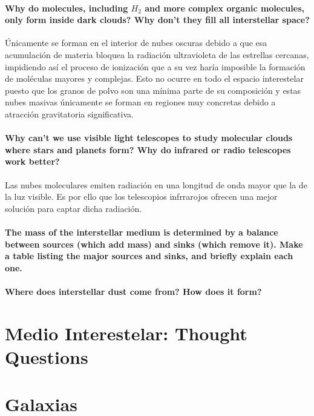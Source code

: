 \documentclass{tufte-handout}
\begin{document}
\paragraph{\textbf{Why do molecules, including $H_2$ and more complex organic molecules, only form inside dark clouds? Why
don’t they fill all interstellar space?}}

Únicamente se forman en el interior de nubes oscuras debido a que esa acumulación de materia bloquea la radiación ultravioleta de las estrellas cercanas, impidiendo así el proceso de ionización que a su vez haría imposible la formación de moléculas mayores y complejas. Esto no ocurre en todo el espacio interestelar puesto que los granos de polvo son una mínima parte de su composición y estas nubes masivas únicamente se forman en regiones muy concretas debido a atracción gravitatoria significativa.

\paragraph{\textbf{Why can't we use visible light telescopes to study molecular clouds where stars and planets form? Why do
infrared or radio telescopes work better?}}

Las nubes moleculares emiten radiación en una longitud de onda mayor que la de la luz visible. Es por ello que los telescopios infrrarojos ofrecen una mejor solución para captar dicha radiación.

\paragraph{The mass of the interstellar medium is determined by a balance between sources (which add mass) and
sinks (which remove it). Make a table listing the major sources and sinks, and briefly explain each one.}

\paragraph{Where does interstellar dust come from? How does it form?}

\section{Medio Interestelar: Thought Questions}

\clearpage

\section{Galaxias}
\end{document}
